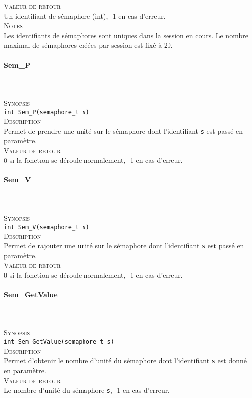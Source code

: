 \documentclass{report}
\newcommand{\myparagraph}[1]{\paragraph*{#1}\mbox{}\\}
\begin{document}
\textsc{Valeur de retour}\\
	Un identifiant de sémaphore (int), -1 en cas d'erreur.\\

\textsc{Notes}\\
	Les identifiants de sémaphores sont uniques dans la session en cours. Le nombre maximal de sémaphores créées par session est fixé à 20.\\
	
\myparagraph{Sem\_P}\\
\textsc{Synopsis}\\	
	\texttt{int Sem\_P(semaphore\_t s)}\\

\textsc{Description}\\
	Permet de prendre une unité sur le sémaphore dont l'identifiant \texttt{s} est passé en paramètre.\\
	
\textsc{Valeur de retour}\\
0 si la fonction se déroule normalement, -1 en cas d'erreur.\\

\myparagraph{Sem\_V}\\
\textsc{Synopsis}\\	

\texttt{int Sem\_V(semaphore\_t s)}\\

\textsc{Description}\\
	Permet de rajouter une unité sur le sémaphore dont l'identifiant \texttt{s} est passé en paramètre.\\
	
\textsc{Valeur de retour}\\
0 si la fonction se déroule normalement, -1 en cas d'erreur.\\

\myparagraph{Sem\_GetValue}\\
\textsc{Synopsis}\\	
	\texttt{int Sem\_GetValue(semaphore\_t s)}\\

\textsc{Description}\\
	Permet d'obtenir le nombre d'unité du sémaphore dont l'identifiant \texttt{s} est donné en paramètre.\\
	
\textsc{Valeur de retour}\\
Le nombre d'unité du sémaphore \texttt{s}, -1 en cas d'erreur.\\
\end{document}
